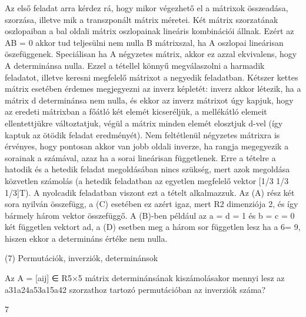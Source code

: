 \begin{frame}
  \begin{tcolorbox}[title={6/8. -Q-}]
Az első feladat arra kérdez rá, hogy mikor végezhető el a mátrixok összeadása, szorzása, illetve mik a transzponált mátrix méretei. Két mátrix szorzatának oszlopaiban a bal oldali mátrix oszlopainak lineáris kombinációi állnak. Ezért az AB = 0 akkor tud teljesülni nem nulla B mátrixszal, ha A oszlopai lineárisan öszefüggenek. Speciálisan ha A négyzetes mátrix, akkor ez azzal ekvivalens, hogy A determinánsa nulla. Ezzel a tétellel könnyű megválaszolni a harmadik feladatot, illetve keresni megfelelő mátrixot a negyedik feladatban. Kétszer kettes mátrix esetében érdemes megjegyezni az inverz képletét: inverz akkor létezik, ha a mátrix d determinánsa nem nulla, és ekkor az inverz mátrixot úgy kapjuk, hogy az eredeti mátrixban a főátló két elemét kicseréljük, a mellékátló elemeit ellentettjükre változtatjuk, végül a mátrix minden elemét elosztjuk d-vel (így kaptuk az ötödik feladat eredményét). Nem feltétlenül négyzetes mátrixra is érvényes, hogy pontosan akkor van jobb oldali inverze, ha rangja megegyezik a sorainak a számával, azaz ha a sorai lineárisan függetlenek. Erre a tételre a hatodik és a hetedik feladat megoldásában nincs szükség, mert azok megoldása közvetlen számolás (a hetedik feladatban az egyetlen megfelelő vektor [1/3 1/3 1/3]T). A nyolcadik feladatban viszont ezt a tételt alkalmazzuk. Az (A) rész két sora nyilván összefügg, a (C) esetében ez azért igaz, mert R2 dimenziója 2, és így bármely három vektor összefüggő. A (B)-ben például az a = d = 1 és b = c = 0 két független vektort ad, a (D) esetben meg a három sor független lesz ha a 6= 9, hiszen ekkor a determináns értéke nem nulla.
  \end{tcolorbox}
\end{frame}


\begin{frame}[plain]
\begin{tcolorbox}[center, colback={myyellow}, coltext={black}, colframe={myyellow}]
    {\RHuge  (7) Permutációk, inverziók, determinánsok}
    \mmedskip
\end{tcolorbox}
\end{frame}

\begin{frame}
  \begin{tcolorbox}[title={7/1. -N-}]
    Az A = [aij] ∈ R5×5 mátrix determinánsának kiszámolásakor mennyi lesz az a31a24a53a15a42 szorzathoz tartozó permutációban az inverziók száma?

  \tcblower

    \mmedskip 
    
    7
  \end{tcolorbox}
\end{frame}


